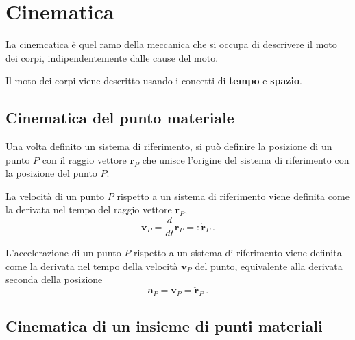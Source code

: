 

\chapter{Cinematica}
\begin{definition}[Cinematica] La cinemcatica è quel ramo della meccanica che si occupa di descrivere il moto dei corpi, indipendentemente dalle cause del moto.
\end{definition}
Il moto dei corpi viene descritto usando i concetti di \textbf{tempo} e \textbf{spazio}.

\section{Cinematica del punto materiale}
\begin{definition}[Posizione]
Una volta definito un sistema di riferimento, si può definire la posizione di un punto $P$ con il raggio vettore $\mathbf{r}_P$ che unisce l'origine del sistema di riferimento con la posizione del punto $P$.
\end{definition}

\begin{definition}[Velocità]
    La velocità di un punto $P$ rispetto a un sistema di riferimento viene definita come la derivata nel tempo del raggio vettore $\mathbf{r}_P$,
    \begin{equation}
        \mathbf{v}_P = \dfrac{d}{dt}\mathbf{r}_P  =: \dot{ \mathbf{r}}_P  \ .
    \end{equation}
\end{definition}

\begin{definition}[Accelerazione]
    L'accelerazione di un punto $P$ rispetto a un sistema di riferimento viene definita come la derivata nel tempo della velocità  $\mathbf{v}_P$ del punto, equivalente alla derivata seconda della posizione
    \begin{equation}
        \mathbf{a}_P = \dot{ \mathbf{v}}_P = \ddot{ \mathbf{r}}_P \ .
    \end{equation}
\end{definition}

\section{Cinematica di un insieme di punti materiali}

